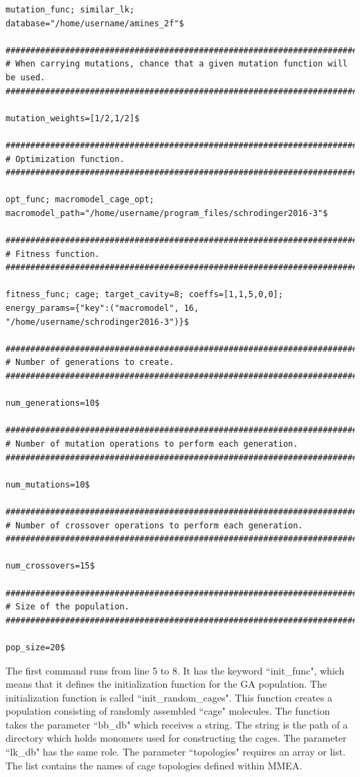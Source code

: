\documentclass[12pt]{article}
\begin{document}
\begin{Verbatim}
mutation_func; similar_lk;
database="/home/username/amines_2f"$

##################################################################################
# When carrying mutations, chance that a given mutation function will be used.
##################################################################################

mutation_weights=[1/2,1/2]$

##################################################################################
# Optimization function.
##################################################################################

opt_func; macromodel_cage_opt;
macromodel_path="/home/username/program_files/schrodinger2016-3"$

##################################################################################
# Fitness function.
##################################################################################

fitness_func; cage; target_cavity=8; coeffs=[1,1,5,0,0];
energy_params={"key":("macromodel", 16, "/home/username/schrodinger2016-3")}$

##################################################################################
# Number of generations to create.
##################################################################################

num_generations=10$

##################################################################################
# Number of mutation operations to perform each generation.
##################################################################################

num_mutations=10$

##################################################################################
# Number of crossover operations to perform each generation.
##################################################################################

num_crossovers=15$

##################################################################################
# Size of the population.
##################################################################################

pop_size=20$
\end{Verbatim}

The first command runs from line 5 to 8. It has the keyword ``init\_func", which means that it defines the initialization function for the GA population. The initialization function is called ``init\_random\_cages". This function creates a population consisting of randomly assembled ``cage" molecules. The function takes the parameter ``bb\_db" which receives a string. The string is the path of a directory which holds monomers used for constructing the cages. The parameter ``lk\_db" has the same role. The parameter ``topologies" requires an array or list. The list contains the names of cage topologies defined within MMEA.
\end{document}
